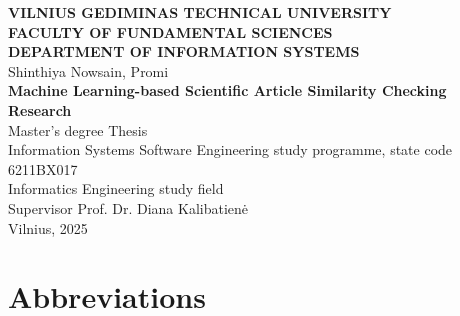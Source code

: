 \documentclass[12pt, a4paper]{article}
\begin{document}
\begin{titlepage}
	\centering
	\textbf{VILNIUS GEDIMINAS TECHNICAL UNIVERSITY}\\
	\textbf{FACULTY OF FUNDAMENTAL SCIENCES}\\
	\textbf{DEPARTMENT OF INFORMATION SYSTEMS}\\
	\vspace{3cm}
	\large
	Shinthiya Nowsain, Promi\\
	\vspace{1.5cm}
	\LARGE
	\textbf{Machine Learning-based Scientific Article Similarity Checking Research}\\
	\vspace{1.5cm}
	\large
	Master's degree Thesis\\
	Information Systems Software Engineering study programme, state code 6211BX017\\
	Informatics Engineering study field\\
	\vspace{2cm}
	Supervisor Prof. Dr. Diana Kalibatien\.{e}\\
	\vfill
	Vilnius, 2025
\end{titlepage}

\newpage
\tableofcontents

\newpage
\section*{Abbreviations}
\end{document}
